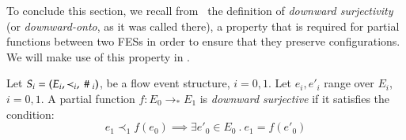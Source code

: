 \medskip

To conclude this section, we recall from~\cite{CZ97} the definition of
\emph{downward surjectivity} (or \emph{downward-onto}, as it was
called there), a property that is required for partial functions
between two FESs in order to ensure that they preserve configurations.
We will make use of this property in .


\begin{definition}
   Let $S_i=(E_i,\prec_i, ~\#~_i)$, be a flow event
  structure, $i=0,1$. 
Let $e_i,e'_i$ range over $E_i$, $i=0,1$.  
A partial function $f: E_0
  \rightarrow_* E_1$ is \emph{downward surjective} if it satisfies the
  condition:
\[e_1 \prec_1 f(e_0) \implies \exists e'_0 \in E_0~.~e_1 = f(e'_0) \]
 \end{definition}

